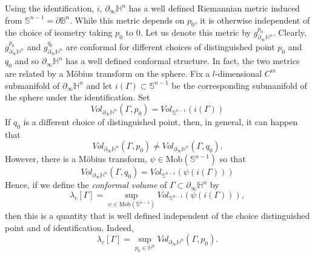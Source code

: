 \documentclass{amsart}
\theoremstyle{definition}
\theoremstyle{remark}
\numberwithin{equation}{section}
\begin{document}
Using the identification, $i$, $\partial_{\infty} \mathbb{H}^n$ has a well defined Riemannian metric induced from $\mathbb{S}^{n-1}=\partial \mathbb{B}^n$.  While this metric depends on $p_0$, it is otherwise independent of the choice of isometry taking $p_0$ to $0$. Let us denote this metric by $g_{\partial_\infty \mathbb{H}^n}^{p_0}$. 
  Clearly, $g_{\partial_\infty \mathbb{H}^{n}}^{p_0}$ and $g_{\partial_\infty \mathbb{H}^{n}}^{q_0}$ are conformal for different choices of distinguished point $p_0$ and $q_0$ and so $\partial_\infty \mathbb{H}^n$ has a well defined conformal structure. In fact, the two metrics are related by a M\"{o}bius transform on the sphere.   Fix a $l$-dimensional $C^m$ submanifold of $\partial_\infty \mathbb{H}^n$ and let $i(\Gamma)\subset \mathbb{S}^{n-1}$ be the corresponding submanifold of the sphere under the identification.  Set
$$
Vol_{\partial_\infty \mathbb{H}^n}(\Gamma,p_0)=Vol_{\mathbb{S}^{n-1}}(i(\Gamma))
$$
If $q_0$ is a different choice of distinguished point, then, in general, it can happen that
$$
Vol_{\partial_\infty \mathbb{H}^n}(\Gamma,p_0)\neq Vol_{\partial_\infty \mathbb{H}^n}(\Gamma,q_0).
$$ 
However, there is a M\"{o}bius transform, $\psi\in \mathrm{Mob}(\mathbb{S}^{n-1})$ so that
$$
Vol_{\partial_\infty \mathbb{H}^n}(\Gamma,q_0)=Vol_{\mathbb{S}^{n-1}}(\psi(i(\Gamma)))
$$
Hence, if we define the \emph{conformal volume}  of $\Gamma\subset \partial_\infty \mathbb{H}^n$ by
$$
\lambda_{c}[\Gamma]=\sup_{\psi\in \mathrm{Mob}(\mathbb{S}^{n-1})} Vol_{\mathbb{S}^{n-1}}(\psi(i(\Gamma))),
$$
then this is a quantity that is well defined independent of the choice distinguished point and of identification.  Indeed,
$$
\lambda_c[\Gamma]=\sup_{p_0\in \mathbb{H}^n} Vol_{\partial_\infty \mathbb{H}^n}(\Gamma,p_0).
$$
\end{document}
